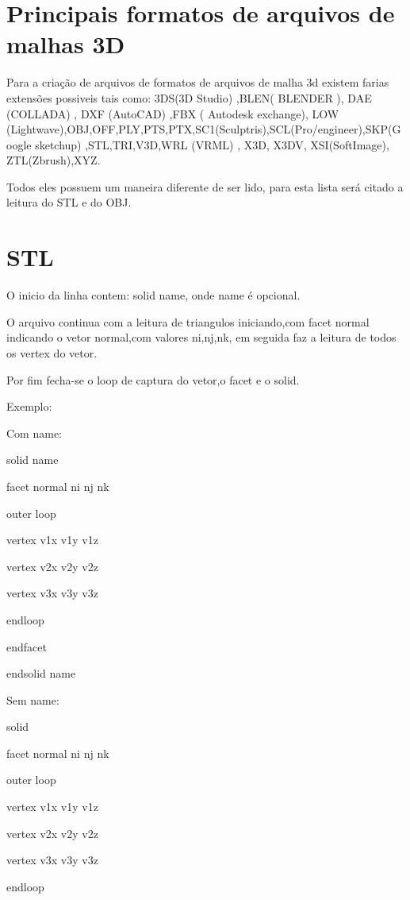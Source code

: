 \documentclass[12pt]{article}
\begin{document}
\section{Principais formatos de arquivos de malhas 3D}
  Para a cria\c{c}\~ao de arquivos de formatos de arquivos de malha 3d existem farias extensões possiveis tais como:
  3DS(3D Studio) ,BLEN( BLENDER ), DAE (COLLADA) , DXF (AutoCAD) ,FBX ( Autodesk exchange), 
  LOW (Lightwave),OBJ,OFF,PLY,PTS,PTX,SC1(Sculptris),SCL(Pro/engineer),SKP(Google sketchup)
  ,STL,TRI,V3D,WRL (VRML) , X3D, X3DV, XSI(SoftImage), ZTL(Zbrush),XYZ.
  
  Todos eles possuem um maneira diferente de ser lido, para esta lista ser\'a citado a leitura do STL e do OBJ.
 
 \section*{STL}   
   O inicio da linha contem:  solid name, onde name é opcional. 
   
   O arquivo continua com a leitura de triangulos iniciando,com facet normal indicando o vetor normal,com valores ni,nj,nk,
   em seguida faz a leitura de todos os vertex do vetor.
   
   Por fim fecha-se o loop de captura do vetor,o facet e o solid.  
  
  Exemplo:
  
  
  Com name:
  
  solid name
  
  facet normal ni nj nk
  
  
        outer loop

        vertex v1x v1y v1z
 
        vertex v2x v2y v2z
 
        vertex v3x v3y v3z
      
      endloop
    
    endfacet
  
  endsolid name
  
  Sem name:
  
  solid 
  
    facet normal ni nj nk
    
      outer loop
      
       vertex v1x v1y v1z

       vertex v2x v2y v2z
 
       vertex v3x v3y v3z
  
       endloop
      
\end{document}
